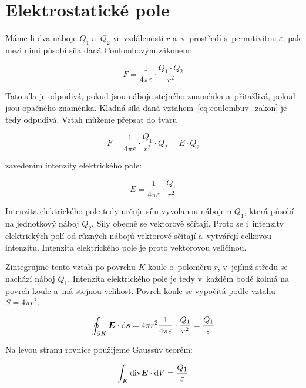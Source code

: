 \section{Elektrostatické pole}

Máme-li dva náboje \(Q_1\) a~\(Q_2\) ve vzdálenosti \(r\) a~v~prostředí s~permitivitou \(\varepsilon\), pak mezi nimi působí síla daná Coulombovým zákonem:

\begin{equation}
\label{eq:coulombuv_zakon}
F = \frac{1}{4 \pi \varepsilon} \cdot \frac{Q_1 \cdot Q_2}{r^2}
\end{equation}

Tato síla je odpudivá, pokud jsou náboje stejného znaménka a~přitažlivá, pokud jsou opačného znaménka. Kladná síla daná vztahem~\eqref{eq:coulombuv_zakon} je tedy odpudivá. Vztah můžeme přepsat do tvaru 

\begin{equation}
F = \frac{1}{4 \pi \varepsilon} \cdot \frac{Q_1}{r^2} \cdot Q_2 = E \cdot Q_2
\end{equation}

zavedením intenzity elektrického pole:

\begin{equation}
\label{eq:intenzita_elektrickeho_pole_bodoveho_naboje}
E = \frac{1}{4 \pi \varepsilon} \cdot \frac{Q_1}{r^2}
\end{equation}

Intenzita elektrického pole tedy určuje sílu vyvolanou nábojem \(Q_1\), která působí na jednotkový náboj \(Q_2\). Síly obecně se vektorově sčítají. Proto se i~intenzity elektrických polí od různých nábojů vektorově sčítají a~vytvářejí celkovou intenzitu. Intenzita elektrického pole je proto vektorovou veličinou.  

Zintegrujme tento vztah po povrchu \(K\) koule o~poloměru \(r\), v~jejímž středu se nachází náboj \(Q_1\). Intenzita elektrického pole je tedy v~každém bodě kolmá na povrch koule a~má stejnou velikost. Povrch koule se vypočítá podle vztahu \(S = 4 \pi r^2\).

\begin{equation}
\oint_{\partial K} \boldsymbol{E} \cdot \mathrm{d}\boldsymbol{s} = 4 \pi r^2 \frac{1}{4 \pi \varepsilon} \cdot \frac{Q_1}{r^2} = \frac{Q_1}{\varepsilon}
\end{equation}

Na levou stranu rovnice použijeme Gaussův teorém: 

\begin{equation}
\int_{K} \mathrm{div} \boldsymbol{E} \cdot \mathrm{d}V = \frac{Q_1}{\varepsilon}
\end{equation}

